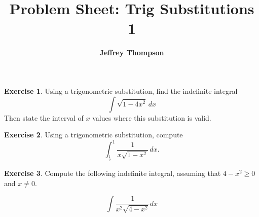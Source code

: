 \documentclass[a4paper]{article}
\theoremstyle{plain}
\theoremstyle{definition}
\newtheorem{exercise}{Exercise}
\numberwithin{equation}{subsection}
\begin{document}
\title{\textbf{Problem Sheet: Trig Substitutions 1}}
\author{\textbf{Jeffrey Thompson}}
\maketitle

\begin{exercise}
Using a trigonometric substitution, find the indefinite integral
\[
    \int \sqrt{1 - 4x^2} \, dx
\]
Then state the interval of $x$ values where this substitution is valid.
\end{exercise}

\begin{exercise}
Using a trigonometric substitution, compute
\[
    \int_{\frac{1}{2}}^{1}\frac{1}{x\sqrt{1-x^2}}\,dx.
\]
\end{exercise}

\begin{exercise}
Compute the following indefinite integral, assuming that $4-x^2\geq 0$ and $x\neq0$.

\[
    \int \frac{1}{x^2 \sqrt{4 - x^2}}dx
\]
\end{exercise}
\end{document}
